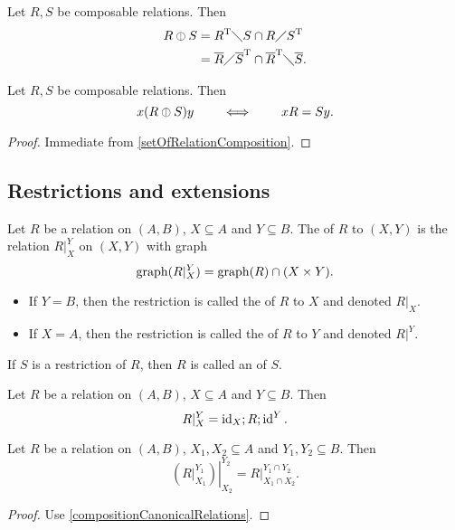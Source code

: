 \begin{lemma}
Let $R,S$ be composable relations. Then
\begin{align*}
R\mathbin{\obar} S &= R^{\mathrm{T}}\diagdown S \cap R\diagup S^{\mathrm{T}} \\
&= \overline{R}\diagup \overline{S}^{\mathrm{T}} \cap \overline{R}^{\mathrm{T}} \diagdown \overline{S}.
\end{align*}
\end{lemma}

\begin{lemma}
Let $R,S$ be composable relations. Then
\[ x(R\mathbin{\obar} S)y \qquad\iff\qquad xR = Sy. \]
\end{lemma}
\begin{proof}
Immediate from \ref{setOfRelationComposition}.
\end{proof}

\subsection{Restrictions and extensions}
\begin{definition}
Let $R$ be a relation on $(A, B)$, $X\subseteq A$ and $Y \subseteq B$. The  of $R$ to $(X,Y)$ is the relation $R|^Y_X$ on $(X,Y)$ with graph
\[ \operatorname{graph}(R|^Y_X) = \operatorname{graph}(R)\cap (X\times Y). \]
\begin{itemize}
\item If $Y = B$, then the restriction is called the  of $R$ to $X$ and denoted $\left.R\right|_X$.
\item If $X = A$, then the restriction is called the  of $R$ to $Y$ and denoted $\left.R\right|^Y$.
\end{itemize}
If $S$ is a restriction of $R$, then $R$ is called an  of $S$.
\end{definition}

\begin{lemma}
Let $R$ be a relation on $(A, B)$, $X\subseteq A$ and $Y \subseteq B$. Then
\[ R|^Y_X = \operatorname{id}_X;R;\operatorname{id}^Y. \]
\end{lemma}
\begin{corollary}
Let $R$ be a relation on $(A, B)$, $X_1,X_2\subseteq A$ and $Y_1,Y_2 \subseteq B$. Then
\[ \left.\left(R|_{X_1}^{Y_1}\right)\right|_{X_2}^{Y_2} = R|_{X_1\cap X_2}^{Y_1\cap Y_2}. \]
\end{corollary}
\begin{proof}
Use \ref{compositionCanonicalRelations}.
\end{proof} 

